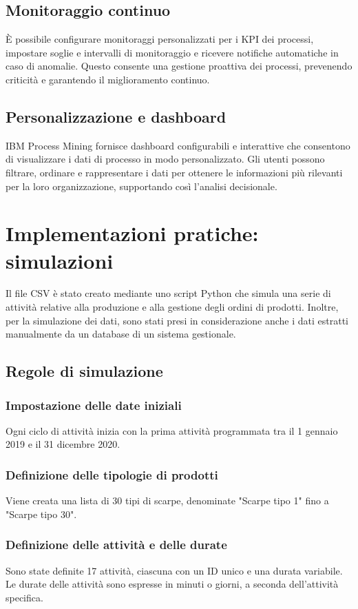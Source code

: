 \documentclass{article}
\begin{document}
\subsection{Monitoraggio continuo}
È possibile configurare monitoraggi personalizzati per i KPI dei processi, impostare soglie e intervalli di monitoraggio e ricevere notifiche automatiche in caso di anomalie. Questo consente una gestione proattiva dei processi, prevenendo criticità e garantendo il miglioramento continuo.

\subsection{Personalizzazione e dashboard}
IBM Process Mining fornisce dashboard configurabili e interattive che consentono di visualizzare i dati di processo in modo personalizzato. Gli utenti possono filtrare, ordinare e rappresentare i dati per ottenere le informazioni più rilevanti per la loro organizzazione, supportando così l'analisi decisionale.

\section{Implementazioni pratiche: simulazioni}
Il file CSV è stato creato mediante uno script Python che simula una serie di attività relative alla produzione e alla gestione degli ordini di prodotti. Inoltre, per la simulazione dei dati, sono stati presi in considerazione anche i dati estratti manualmente da un database di un sistema gestionale.
\subsection{Regole di simulazione}
\subsubsection{Impostazione delle date iniziali}
Ogni ciclo di attività inizia con la prima attività programmata tra il 1 gennaio 2019 e il 31 dicembre 2020.\\
\subsubsection{Definizione delle tipologie di prodotti}
Viene creata una lista di 30 tipi di scarpe, denominate "Scarpe tipo 1" fino a "Scarpe tipo 30".\\
\subsubsection{Definizione delle attività e delle durate}
Sono state definite 17 attività, ciascuna con un ID unico e una durata variabile. Le durate delle attività sono espresse in minuti o giorni, a seconda dell'attività specifica.\\
\end{document}
